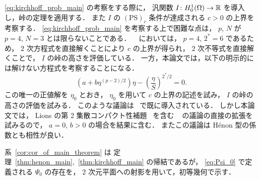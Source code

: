 \eqref{eq:kirchhoff_prob_main} の考察をする際に，
汎関数 $I \colon H_0^1(\Omega) \to \mathbb{R}$ を導入し，峠の定理を適用する．
また $I$ の $(\text{PS})_c$ 条件が達成される $c > 0$ の上界を考察する．
\eqref{eq:kirchhoff_prob_main} を考察する上で困難な点は，
$p$, $N$ が $p = 4$, $N = 3$ とは限らないことである．
~\cite{MR3278854} においては， $p = 4$, $2^* = 6$
であるため， $2$ 次方程式を直接解くことにより
$c$ の上界が得られ，
$2$ 次不等式を直接解くことで， $I$ の峠の高さを評価している．
一方，本論文では，以下の明示的には解けない方程式を考察することになる．
\[
  \left( a + b \eta^{(p-2)/2} \right) \eta - \left( \frac{\eta}{S} \right)^{2^*/2} = 0.
\]
この唯一の正値解を $\eta_0$ とおき，
$\eta_0$ を用いて $c$ の上界の記述を試み，
$I$ の峠の高さの評価を試みる．
このような議論は~\cite{MR3539075} で既に導入されている．
しかし本論文では，
Lions の第 2 集散コンパクト性補題~\cite{MR834360} を含む
~\cite{MR3278854} の議論の直接の拡張を試みるので，
$a = 0$, $b > 0$ の場合を結果に含む．
またこの議論は Hénon 型の係数とも相性が良い．

系~\ref{cor:cor_of_main_theorem} は
定理~\ref{thm:henon_main},~\ref{thm:kirchhoff_main}
の帰結であるが，
\eqref{eq:Psi_0} で定義される $\Psi_0$ の存在を，
$2$ 次元平面への射影を用いて，初等幾何で示す．